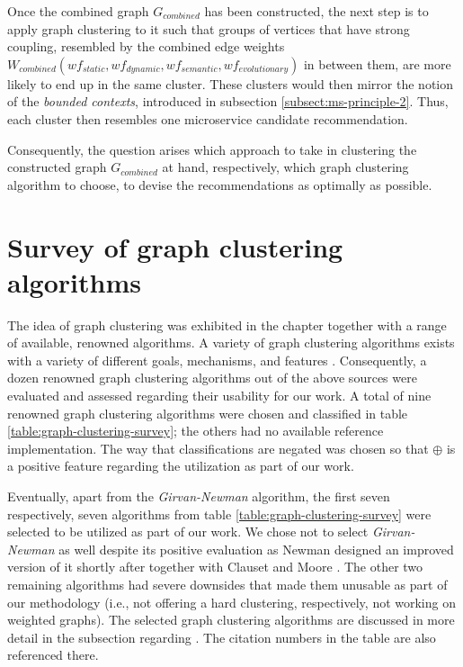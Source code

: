 \documentclass[12pt,a4paper]{report}
\begin{document}
Once the combined graph \(G_{combined}\) has been constructed,
the next step is to apply graph clustering to it such that groups of vertices
that have strong coupling, resembled by the combined edge weights
\(W_{combined}(wf_{static}, wf_{dynamic}, wf_{semantic}, wf_{evolutionary})\)
in between them, are more likely to end up in the same cluster.
These clusters would then mirror
the notion of the \textit{bounded contexts}, introduced in subsection
\ref{subsect:ms-principle-2}. Thus, each cluster then resembles one microservice
candidate recommendation.

Consequently, the question arises which approach to take in clustering the
constructed graph \(G_{combined}\) at hand, respectively, which graph
clustering algorithm to choose, to devise the recommendations as optimally as
possible.



\section{Survey of graph clustering algorithms} \label{sect:graph-clustering-algorithm-survey}

The idea of graph clustering was exhibited in the
\textit{} chapter together with a range of available,
renowned algorithms.
A variety of graph clustering algorithms exists with a variety of different
goals, mechanisms, and features \cite{lancichinetti2009community,
fortunato2010community, danon2005comparing}. Consequently, a dozen renowned
graph clustering algorithms out of the above sources were evaluated and
assessed regarding their usability for our work. A total of nine renowned graph
clustering algorithms were chosen and classified in table
\ref{table:graph-clustering-survey}; the others had no available reference implementation.
The way that classifications are negated was chosen so that $\oplus$ is a positive
feature regarding the utilization as part of our work.

Eventually, apart from the \textit{Girvan-Newman} algorithm, the first seven
respectively, seven algorithms from table \ref{table:graph-clustering-survey}
were selected to be utilized as part of our work. We chose not to select
\textit{Girvan-Newman} as well despite its positive evaluation as Newman
designed an improved version of it shortly after together with Clauset and
Moore \cite{clauset2004modularity}. The other two remaining algorithms had
severe downsides that made them unusable as part of our methodology (i.e., not
offering a hard clustering, respectively, not working on weighted graphs). The
selected graph clustering algorithms are discussed in more detail in the
\textit{} subsection regarding
\textit{}.
The citation numbers in the table are also referenced there.
\end{document}
